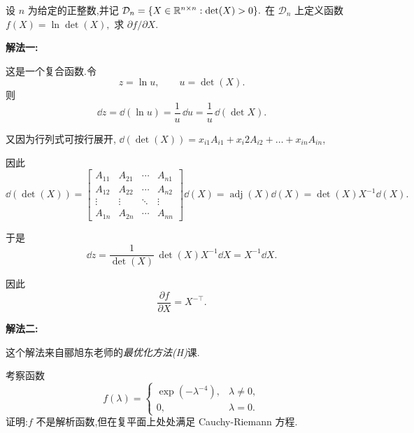 \begin{problem}[选做]
设 $n$ 为给定的正整数,并记
\(
\mathcal{D}_n=\{X\in\mathbb{R}^{n\times n}:\det(X)>0\}.
\)
在 $\mathcal{D}_n$ 上定义函数
\(
f(X)=\ln\det(X),
\)
求 $\partial f/\partial X$.
\begin{solution}

\textbf{解法一:}

这是一个复合函数.令
\[
z=\ln u,\qquad u=\det(X).
\]
则
\[
\dd z=\dd(\ln u)=\frac1u\,\dd u=\frac1u\,\dd(\det X).
\]

又因为行列式可按行展开, $\dd (\det (X)) = x_{i1}A_{i1} + x_i2A_{i2} + \ldots + x_{in}A_{in}$,

因此
\(
\dd(\det (X))
=
\begin{bmatrix}
A_{11}&A_{21}&\cdots&A_{n1}\\
A_{12}&A_{22}&\cdots&A_{n2}\\
\vdots&\vdots&\ddots&\vdots\\
A_{1n}&A_{2n}&\cdots&A_{nn}
\end{bmatrix} \dd(X)
=\operatorname{adj}(X) \dd(X)
=\det(X)X^{-1} \dd(X).
\)

于是
\[
\dd z
=\frac1{\det(X)}\,\det(X)X^{-1}\dd X
=X^{-1}\dd X.
\]

因此
\[
\frac{\partial f}{\partial X}=X^{-\top}.
\]

\textbf{解法二:}

这个解法来自郦旭东老师的\textit{最优化方法(H)}课.



\end{solution}
\end{problem}

\begin{problem}[选做]
考察函数
\[
f(\lambda)=
\begin{cases}
\exp(-\lambda^{-4}), & \lambda\ne0,\\
0, & \lambda=0.
\end{cases}
\]
证明:$f$ 不是解析函数,但在复平面上处处满足 Cauchy-Riemann 方程.
\end{problem}

